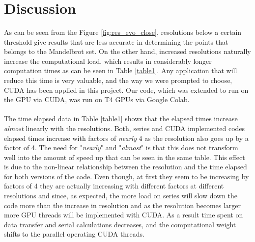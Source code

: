 \documentclass{report}
\begin{document}
\newpage
\section{Discussion}
\paragraph{}
As can be seen from the Figure \ref{fig:res_evo_close}, resolutions below a certain threshold give results that are less accurate in determining the points that belongs to the Mandelbrot set. On the other hand, increased resolutions naturally increase the computational load, which results in considerably longer computation times as can be seen in Table \ref{table1}. Any application that will reduce this time is very valuable, and the way we were prompted to choose, CUDA has been applied in this project. Our code, which was extended to run on the GPU via CUDA, was run on T4 GPUs via Google Colab.

\paragraph{}
The time elapsed data in Table \ref{table1} shows that the elapsed times increase \emph{almost} linearly with the resolutions. Both, series and CUDA implemented codes elapsed times increase with factors of \emph{nearly} 4 as the resolution also goes up by a factor of 4. The need for "\emph{nearly}" and "\emph{almost}" is that this does not transform well into the amount of speed up that can be seen in the same table. This effect is due to the non-linear relationship between the resolution and the time elapsed for both versions of the code. Even though, at first they seem to be increasing by factors of 4 they are actually increasing with different factors at different resolutions and since, as expected, the more load on series will slow down the code more than the increase in resolution and as the resolution becomes larger more GPU threads will be implemented with CUDA. As a result time spent on data transfer and serial calculations decreases, and the computational weight shifts to the parallel operating CUDA threads.
\end{document}
